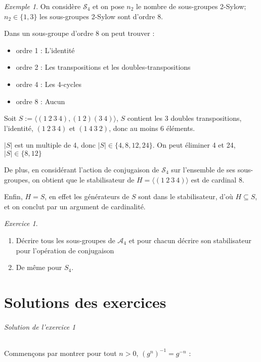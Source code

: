 \documentclass[]{article}
\theoremstyle{remark}
\newtheorem{myexer}{Exercice}
\newtheorem{myexmpl}{Exemple}
\theoremstyle{definition}
\begin{document}
\begin{myexmpl}
	On considère $\mathscr{S}_4$ et on pose $n_2$ le nombre de sous-groupes 2-Sylow; $n_2 \in \{1, 3\}$ les sous-groupes 2-Sylow sont d'ordre 8.
	
	Dans un sous-groupe d'ordre 8 on peut trouver :
	\begin{itemize}
		\item ordre 1 : L'identité
		\item ordre 2 : Les transpositions et les doubles-transpositions
		\item ordre 4 : Les 4-cycles
		\item ordre 8 : Aucun
	\end{itemize}
	
	Soit $S := \langle (1 ~ 2 ~ 3 ~ 4) , (1 ~ 2)(3~ 4)\rangle$, $S$ contient les 3 doubles transpositions, l'identité, $(1 ~ 2 ~ 3 ~ 4)$ et $(1 ~ 4 ~ 3 ~ 2)$, donc au moins 6 éléments.
	
	$|S|$ est un multiple de 4, donc $|S| \in \{4, 8, 12, 24\}$. On peut éliminer 4 et 24, $|S| \in \{8, 12\}$
	
	De plus, en considérant l'action de conjugaison de $\mathscr{S}_4$ sur l'ensemble de ses sous-groupes, on obtient que le stabilisateur de $H = \langle (1 ~ 2 ~ 3 ~ 4)\rangle$ est de cardinal 8.
	
	Enfin, $H = S$, en effet les générateurs de $S$ sont dans le stabilisateur, d'où $H \subseteq S$, et on conclut par un argument de cardinalité.
\end{myexmpl}

\begin{myexer}
	\begin{enumerate}
		\leavevmode
		\item Décrire tous les sous-groupes de $\mathcal{A}_4$ et pour chacun décrire son stabilisateur pour l'opération de conjugaison
		\item De même pour $S_4$.
	\end{enumerate}
\end{myexer}

\part{Solutions des exercices}

\paragraph{Solution de l'exercice 1}

Commençons par montrer pour tout $n > 0$, $( g^n )^{-1} = g^{-n}$ :
\end{document}
